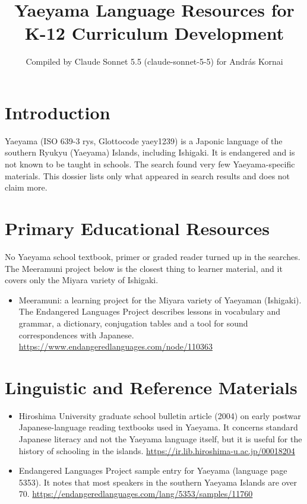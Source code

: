 \documentclass[12pt]{article}
\title{Yaeyama Language Resources for K-12 Curriculum Development}
\author{Compiled by Claude Sonnet 5.5 (claude-sonnet-5-5) for Andr\'as Kornai}
\date{}
\begin{document}
\maketitle

\section{Introduction}
Yaeyama (ISO 639-3 rys, Glottocode yaey1239) is a Japonic language of the southern Ryukyu (Yaeyama) Islands, including Ishigaki. It is endangered and is not known to be taught in schools. The search found very few Yaeyama-specific materials. This dossier lists only what appeared in search results and does not claim more.

\section{Primary Educational Resources}
No Yaeyama school textbook, primer or graded reader turned up in the searches. The Meeramuni project below is the closest thing to learner material, and it covers only the Miyara variety of Ishigaki.
\begin{itemize}
\item Meeramuni: a learning project for the Miyara variety of Yaeyaman (Ishigaki). The Endangered Languages Project describes lessons in vocabulary and grammar, a dictionary, conjugation tables and a tool for sound correspondences with Japanese. \url{https://www.endangeredlanguages.com/node/110363}
\end{itemize}

\section{Linguistic and Reference Materials}
\begin{itemize}
\item Hiroshima University graduate school bulletin article (2004) on early postwar Japanese-language reading textbooks used in Yaeyama. It concerns standard Japanese literacy and not the Yaeyama language itself, but it is useful for the history of schooling in the islands. \url{https://ir.lib.hiroshima-u.ac.jp/00018204}
\item Endangered Languages Project sample entry for Yaeyama (language page 5353). It notes that most speakers in the southern Yaeyama Islands are over 70. \url{https://endangeredlanguages.com/lang/5353/samples/11760}
\end{itemize}
\end{document}
